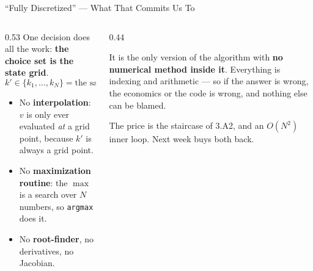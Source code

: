 \begin{frame}{``Fully Discretized'' --- What That Commits Us To}
\begin{columns}[T]
\begin{column}{0.53\textwidth}
\small
One decision does all the work: \textbf{the choice set is the state grid}.
\[
  k'\in\{k_1,\dots,k_N\}=\text{the same grid } k \text{ lives on.}
\]
\begin{itemize}\footnotesize
  \item No \textbf{interpolation}: $v$ is only ever evaluated \emph{at} a grid point, because $k'$ is always a grid point.
  \item No \textbf{maximization routine}: the $\max$ is a search over $N$ numbers, so \texttt{argmax} does it.
  \item No \textbf{root-finder}, no derivatives, no Jacobian.
\end{itemize}
\end{column}
\begin{column}{0.44\textwidth}
\begin{conceptbox}[title=\textbf{Why start here}]\small
It is the only version of the algorithm with \textbf{no numerical method inside it}. Everything is indexing and arithmetic --- so if the answer is wrong, the economics or the code is wrong, and nothing else can be blamed.
\end{conceptbox}
\medskip
\begin{cautionbox}\footnotesize
The price is the staircase of 3.A2, and an $O(N^2)$ inner loop. Next week buys both back.
\end{cautionbox}
\end{column}
\end{columns}
\end{frame}

